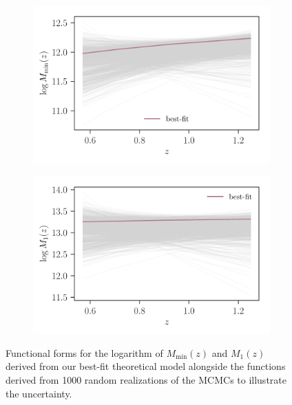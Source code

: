 \documentclass[a4paper,11pt]{article}
\begin{document}
      \begin{figure}
        \begin{center}
          \begin{subfigure}[t]{0.49\textwidth}
          \includegraphics[width=\textwidth]{figures/logM_min_z_dependence_mPk=HOD_fix=alpha-fc-sigmaM_HOD=zevol_fit=pz-shifts+prior=0p2-pz-widths+prior=0p2_fit=auto+cross_cosmo=const_cov=G+NG+SSC-LINBIAS_HOD-param=zfid_clfit=HOD-zevol_best-fit+random-draws.pdf}
          \end{subfigure}
          \begin{subfigure}[t]{0.49\textwidth}
          \includegraphics[width=\textwidth]{figures/logM_1_z_dependence_mPk=HOD_fix=alpha-fc-sigmaM_HOD=zevol_fit=pz-shifts+prior=0p2-pz-widths+prior=0p2_fit=auto+cross_cosmo=const_cov=G+NG+SSC-LINBIAS_HOD-param=zfid_clfit=HOD-zevol_best-fit+random-draws.pdf}
          \end{subfigure}
          \caption{Functional forms for the logarithm of $M_{\mathrm{min}}(z)$ and $M_{1}(z)$ derived from our best-fit theoretical model alongside the functions derived from 1000 random realizations of the MCMCs to illustrate the uncertainty.} 
          \label{fig:hod-params-z-dep}
        \end{center}
      \end{figure}
\end{document}
